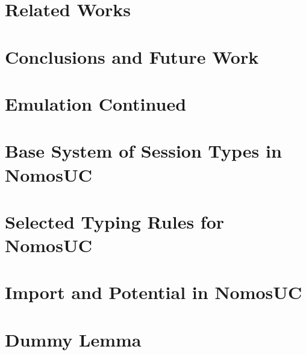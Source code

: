 \documentclass[conference]{IEEEtran}
\begin{document}
\section{Related Works} \label{sec:related}


\section{Conclusions and Future Work}





\newpage


\appendices

% 

\section{Emulation Continued} \label{app:emulation}


\section{Base System of Session Types in NomosUC} \label{app:basic}


\section{Selected Typing Rules for NomosUC} \label{app:typing_rules}


\section{Import and Potential in NomosUC} \label{sec:import}


%

\section{Dummy Lemma} \label{app:dummy}

\end{document}
